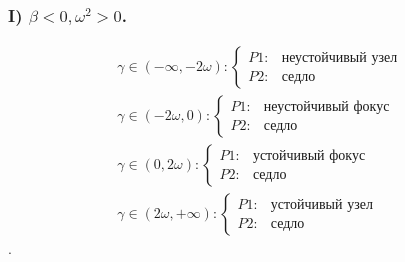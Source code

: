 \documentclass[11pt]{article}
\begin{document}
\hypertarget{i-beta-0-omega2-0.}{%
\subsubsection{\texorpdfstring{I)
\(\beta < 0, \omega^2 > 0\).}{I) \textbackslash beta \textless{} 0, \textbackslash omega\^{}2 \textgreater{} 0.}}\label{i-beta-0-omega2-0.}}

\[
\begin{array}{cc}
\gamma \in \left(-\infty ,-2 \omega \right): \left\{
\begin{array}{cc}
 P1  : & \text{неустойчивый узел}  \\
 P2  : & \text{седло}
\end{array} \right. \\
\gamma \in \left(-2 \omega, 0 \right): \left\{
\begin{array}{cc}
 P1  : & \text{неустойчивый фокус}  \\
 P2  : & \text{седло}
\end{array} \right. \\ 
\gamma \in \left(0 ,2 \omega \right): \left\{
\begin{array}{cc}
 P1  : & \text{устойчивый фокус}  \\
 P2  : & \text{седло}
\end{array} \right. \\
\gamma \in \left(2 \omega, + \infty \right): \left\{
\begin{array}{cc}
 P1  : & \text{устойчивый узел}  \\
 P2  : & \text{седло}
\end{array} \right.
\end{array}
\].
\end{document}
